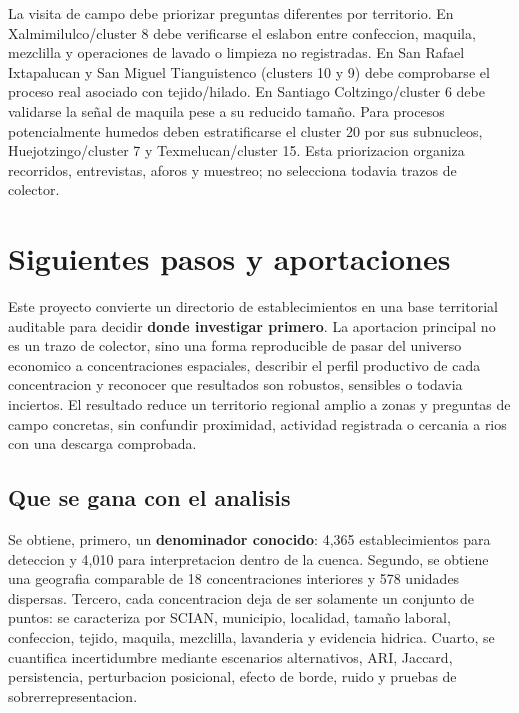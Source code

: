\documentclass[11pt,letterpaper]{article}
\begin{document}
La visita de campo debe priorizar preguntas diferentes por territorio. En Xalmimilulco/cluster 8 debe verificarse el eslabon entre confeccion, maquila, mezclilla y operaciones de lavado o limpieza no registradas. En San Rafael Ixtapalucan y San Miguel Tianguistenco (clusters 10 y 9) debe comprobarse el proceso real asociado con tejido/hilado. En Santiago Coltzingo/cluster 6 debe validarse la señal de maquila pese a su reducido tamaño. Para procesos potencialmente humedos deben estratificarse el cluster 20 por sus subnucleos, Huejotzingo/cluster 7 y Texmelucan/cluster 15. Esta priorizacion organiza recorridos, entrevistas, aforos y muestreo; no selecciona todavia trazos de colector.

\section{Siguientes pasos y aportaciones}

Este proyecto convierte un directorio de establecimientos en una base territorial auditable para decidir \textbf{donde investigar primero}. La aportacion principal no es un trazo de colector, sino una forma reproducible de pasar del universo economico a concentraciones espaciales, describir el perfil productivo de cada concentracion y reconocer que resultados son robustos, sensibles o todavia inciertos. El resultado reduce un territorio regional amplio a zonas y preguntas de campo concretas, sin confundir proximidad, actividad registrada o cercania a rios con una descarga comprobada.

\subsection{Que se gana con el analisis}

Se obtiene, primero, un \textbf{denominador conocido}: 4,365 establecimientos para deteccion y 4,010 para interpretacion dentro de la cuenca. Segundo, se obtiene una geografia comparable de 18 concentraciones interiores y 578 unidades dispersas. Tercero, cada concentracion deja de ser solamente un conjunto de puntos: se caracteriza por SCIAN, municipio, localidad, tamaño laboral, confeccion, tejido, maquila, mezclilla, lavanderia y evidencia hidrica. Cuarto, se cuantifica incertidumbre mediante escenarios alternativos, ARI, Jaccard, persistencia, perturbacion posicional, efecto de borde, ruido y pruebas de sobrerrepresentacion.
\end{document}
